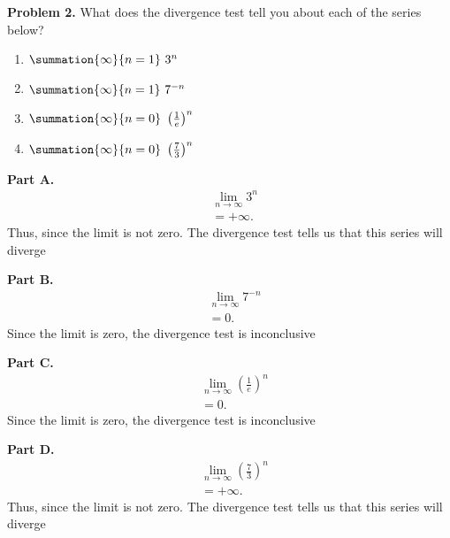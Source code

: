 \documentclass{report}
\begin{document}
    \bigbreak \noindent 
    \begin{mdframed}
        \textbf{Problem 2.} What does the divergence test tell you about each of the series below?
        \begin{enumerate}[label=(\alph*)]
            \item $\summation{\infty}{n=1}\ 3^{n}\ $
            \item $\summation{\infty}{n=1}\ 7^{-n}\ $
            \item $\summation{\infty}{n=0}\ \left(\frac{1}{e}\right)^{n}\ $
            \item $\summation{\infty}{n=0}\ \left(\frac{7}{3}\right)^{n}\ $
        \end{enumerate}
    \end{mdframed}
    \bigbreak \noindent 
    \textbf{Part A.}
    \begin{align*}
        &\lim\limits_{n \to \infty}{3^{n}} \\
        &=+\infty
    .\end{align*}
    Thus, since the limit is not zero. The divergence test tells us that this series will diverge

    \bigbreak \noindent 
    \textbf{Part B.}
    \begin{align*}
        &\lim\limits_{n \to \infty}{7^{-n}} \\
        &=0
    .\end{align*}
    Since the limit is zero, the divergence test is inconclusive 

    \bigbreak \noindent 
    \textbf{Part C.}
    \begin{align*}
        &\lim\limits_{n \to \infty}{\left(\frac{1}{e}\right)^{n}} \\
        &=0
    .\end{align*}
    Since the limit is zero, the divergence test is inconclusive 

    \bigbreak \noindent 
    \textbf{Part D.}
    \begin{align*}
        &\lim\limits_{n \to \infty}{\left(\frac{7}{3}\right)^{n}}  \\
        &=+\infty
    .\end{align*}
    Thus, since the limit is not zero. The divergence test tells us that this series will diverge
\end{document}
